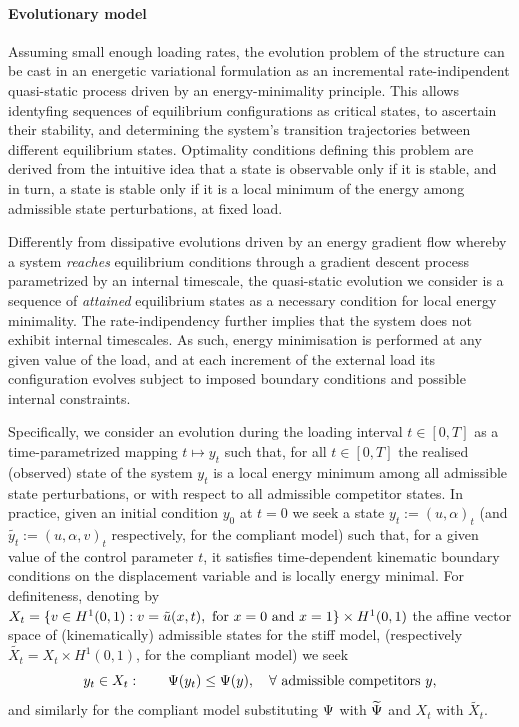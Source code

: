\documentclass[10pt]{article}
\begin{document}
%
%
%
%



%
%
%

%

%

%





\paragraph{Evolutionary model}

Assuming small enough loading rates, 
the evolution problem of the structure can be cast in an energetic variational formulation as an incremental rate-indipendent quasi-static process driven by an energy-minimality principle.
This allows identyfing sequences of equilibrium configurations as critical states, to ascertain their stability, and determining the system's transition trajectories between different equilibrium states.
Optimality conditions defining this problem are derived from the
intuitive idea that a state is observable only if it is stable, and in turn, a state is stable only if it is a local minimum of the energy among admissible state perturbations, at fixed load. 

Differently from dissipative evolutions driven by an energy gradient flow whereby a system \emph{reaches} equilibrium conditions through a gradient descent process parametrized by an internal timescale, the quasi-static evolution we consider is a sequence of \emph{attained} equilibrium states as a necessary condition for local energy minimality. 
The rate-indipendency further implies that the system does not exhibit internal timescales.
As such, energy minimisation is performed at any given value of the load, and at each increment of the external load its configuration evolves subject to imposed boundary conditions and possible internal constraints.
%
%
%

%
Specifically, we consider an evolution during the loading interval $t\in [0, T]$ as a time-parametrized mapping $t\mapsto y_t$  such that, for all $t\in [0, T]$ the realised (observed) state of the system $y_t$ is a local energy minimum among all admissible state perturbations, or with respect to all admissible competitor states. %
In practice, given an initial condition $y_0$ at $t=0$ we seek a state $y_t:=(u, \alpha)_t$ (and $\widetilde{y_t}:=(u, \alpha, v)_t$ respectively, for the compliant model) such that, for a given value of the control parameter $t$, it satisfies time-dependent kinematic boundary conditions on the displacement variable and is locally energy minimal. 
For definiteness, denoting by $X_t = \{v\in H^1(0, 1):v=\tilde u(x, t),\text{ for } x=0\text{ and } x=1\}\times H^1(0,1)$ the affine vector space of (kinematically) admissible states for the stiff model, (respectively $\widetilde{X_t} = X_t\times H^1(0, 1)$, for the compliant model) 
we seek 
%
\begin{equation}
    \label{eq:variational_global_ineq}
    y_t\in X_t: \qquad \Psi(y_t) \leq \Psi(y),\quad \forall \text{ admissible competitors } y,
\end{equation}
and similarly for the compliant model substituting $\Psi$ with $\widetilde\Psi$ and $X_t$ with $\widetilde{X_t}$.
%
%
%
%
%
\end{document}
